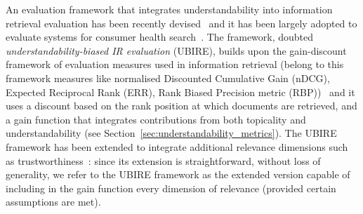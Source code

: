 
An evaluation framework that integrates understandability into information retrieval evaluation has been recently devised~\cite{zuccon14,zuccon16} and it has been largely adopted to evaluate systems for consumer health search~\cite{clef17}. The framework, doubted \textit{understandability-biased IR evaluation} (UBIRE), builds upon the gain-discount framework of evaluation measures used in information retrieval (belong to this framework measures like normalised Discounted Cumulative Gain (nDCG), Expected Reciprocal Rank (ERR), Rank Biased Precision metric (RBP))~\cite{carterette11} and it uses a discount based on the rank position at which documents are retrieved, and a gain function that integrates contributions from both topicality and understandability (see Section~\ref{sec:understandability_metrics}). The UBIRE framework has been extended to integrate additional relevance dimensions such as trustworthiness~\cite{clef17}: since its extension is straightforward, without loss of generality, we refer to the UBIRE framework as the extended version capable of including in the gain function every dimension of relevance (provided certain assumptions are met). 

